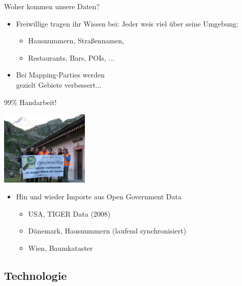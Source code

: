 \documentclass{beamer}
\begin{document}
\begin{frame}{Woher kommen unsere Daten?}

\begin{itemize}
  \item Freiwillige tragen ihr Wissen bei: Jeder weis viel über seine Umgebung:
	\begin{itemize}
	  \item Hausnummern, Straßennamen,
	  \item Restaurants, Bars, POIs, ...
  \end{itemize}
  \pause
  \item Bei Mapping-Parties werden \\ gezielt Gebiete verbessert... 
\end{itemize}

  \vspace{0.5cm}
 99\% Handarbeit!

  \vspace*{-3cm}
 \hfill \includegraphics[width=4.2cm]{alps_mp.jpg}


  \pause
\begin{itemize}
  \item Hin und wieder Importe aus Open Government Data
  \begin{itemize}
    \item USA, TIGER Data (2008)
    \item Dänemark, Hausnummern (laufend synchronisiert)
    \item Wien, Baumkataster
  \end{itemize}
\end{itemize}

\end{frame}

\subsection{Technologie}

\end{document}
